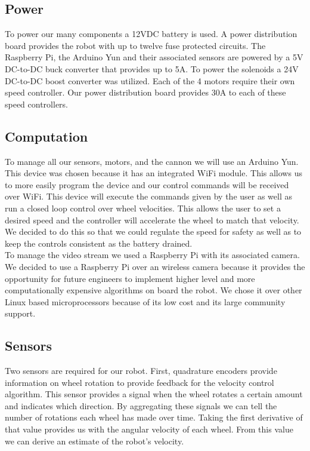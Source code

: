 \documentclass[letterpaper,12pt]{article}
\begin{document}
\subsection{Power}
To power our many components a 12VDC battery is used. A power distribution board provides the robot with up to twelve fuse protected circuits. The Raspberry Pi, the Arduino Yun and their associated sensors are powered by a 5V DC-to-DC buck converter that provides up to 5A. To power the solenoids a 24V DC-to-DC boost converter was utilized. Each of the 4 motors require their own speed controller. Our power distribution board provides 30A to each of these speed controllers. 
\subsection{Computation}
To manage all our sensors, motors, and the cannon we will use an Arduino Yun. This device was chosen because it has an integrated WiFi module. This allows us to more easily program the device and our control commands will be received over WiFi. This device will execute the commands given by the user as well as run a closed loop control over wheel velocities. This allows the user to set a desired speed and the controller will accelerate the wheel to match that velocity. We decided to do this so that we could regulate the speed for safety as well as to keep the controls consistent as the battery drained. \\

To manage the video stream we used a Raspberry Pi with its associated camera. We decided to use a Raspberry Pi over an wireless camera because it provides the opportunity for future engineers to implement higher level and more computationally expensive algorithms on board the robot. We chose it over other Linux based microprocessors because of its low cost and its large community support. 
\subsection{Sensors}
Two sensors are required for our robot. First, quadrature encoders provide information on wheel rotation to provide feedback for the velocity control algorithm. This sensor provides a signal when the wheel rotates a certain amount and indicates which direction. By aggregating these signals we can tell the number of rotations each wheel has made over time. Taking the first derivative of that value provides us with the angular velocity of each wheel. From this value we can derive an estimate of the robot's velocity.\\
\end{document}
